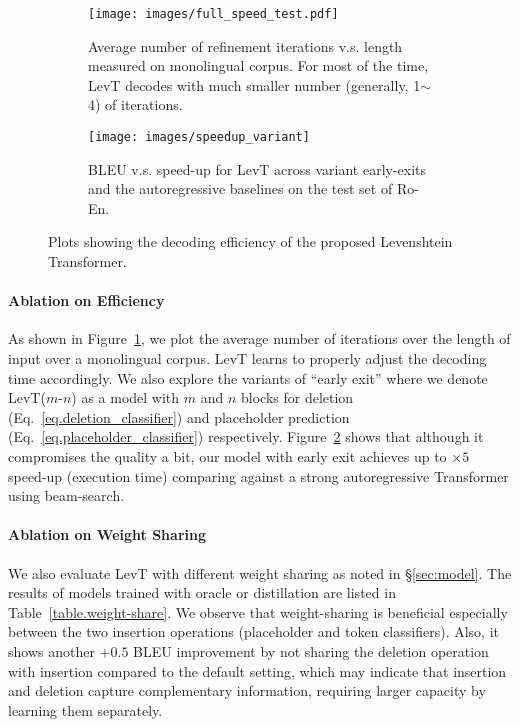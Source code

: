 \documentclass{article}
\newcommand{\secref}[1]{\S\ref{#1}}
\begin{document}
\begin{figure}[t]
    \centering
    \begin{subfigure}[b]{0.58\textwidth}
    \raggedleft
    \texttt{[image: images/full\_speed\_test.pdf]}
    \caption{\label{fig.iter_length} Average number of refinement iterations v.s. length measured on monolingual corpus. 
                For most of the time, LevT decodes with much smaller number (generally, 1$\sim$4) of iterations.}
    \end{subfigure}
    \hspace{2.5pt}
    \begin{subfigure}[b]{0.385 \textwidth}
    \raggedright
    \texttt{[image: images/speedup\_variant]}
    \caption{\label{fig.speedup} BLEU v.s. speed-up for LevT across variant early-exits and the autoregressive baselines on the test set of Ro-En. }
    \end{subfigure}
    \caption{\label{fig.efficiency}Plots showing the decoding efficiency of the proposed Levenshtein Transformer.}
    \vspace{-5pt}
\end{figure}



\paragraph{Ablation on Efficiency}
As shown in Figure~\ref{fig.iter_length}, we plot the average number of iterations over the length of input over a monolingual corpus. LevT learns to properly adjust the decoding time accordingly. We also explore the variants of ``early exit'' where we denote LevT($m$-$n$) as a model with $m$ and $n$ blocks for deletion (Eq.~\eqref{eq.deletion_classifier}) and placeholder prediction (Eq.~\eqref{eq.placeholder_classifier}) respectively. Figure~\ref{fig.speedup} shows that although it compromises the quality a bit, our model with early exit achieves up to $\times 5$ speed-up (execution time) comparing against a strong autoregressive Transformer using beam-search.

\paragraph{Ablation on Weight Sharing}
We also evaluate LevT with different weight sharing as noted in \secref{sec:model}. The results of models trained with oracle or distillation are listed in Table~\ref{table.weight-share}.
We observe that weight-sharing is beneficial especially between the two insertion operations (placeholder and token classifiers). Also, it shows another $+0.5$ BLEU improvement by not sharing the deletion operation with insertion compared to the default setting, which may indicate that insertion and deletion capture complementary information, requiring larger capacity by learning them separately.
\end{document}
